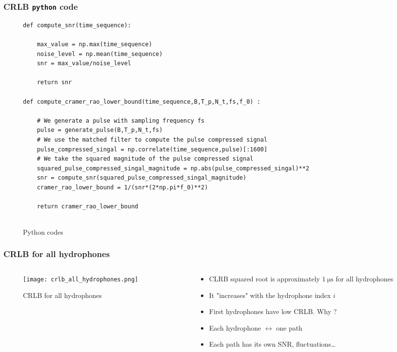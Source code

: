 \documentclass[UKenglish,8pt,aspectratio=1610]{beamer}
\begin{document}
\begin{frame}[fragile]
	\frametitle{CRLB \texttt{python} code}
	\begin{figure}[h!]
	\begin{lstlisting}[language=PythonPlus,style=colorEX]
def compute_snr(time_sequence):
	
	max_value = np.max(time_sequence)
	noise_level = np.mean(time_sequence)
	snr = max_value/noise_level
	
	return snr
	
def compute_cramer_rao_lower_bound(time_sequence,B,T_p,N_t,fs,f_0) :
	
	# We generate a pulse with sampling frequency fs  
	pulse = generate_pulse(B,T_p,N_t,fs)
	# We use the matched filter to compute the pulse compressed signal
	pulse_compressed_singal = np.correlate(time_sequence,pulse)[:1600]
	# We take the squared magnitude of the pulse compressed signal
	squared_pulse_compressed_singal_magnitude = np.abs(pulse_compressed_singal)**2
	snr = compute_snr(squared_pulse_compressed_singal_magnitude)
	cramer_rao_lower_bound = 1/(snr*(2*np.pi*f_0)**2)
	
	return cramer_rao_lower_bound
		
	\end{lstlisting}
	\centering
	\caption{Python codes}
\end{figure}
\end{frame}
\begin{frame}
	\frametitle{CRLB for all hydrophones}
		\begin{columns}
		\begin{column}{0.5\textwidth}
				\vspace{-25pt}
			\begin{figure}[h!]
				\texttt{[image: crlb\_all\_hydrophones.png]}
				\centering
				\caption{CRLB for all hydrophones}
			\end{figure}
			
		\end{column}
		\begin{column}{0.5\textwidth}
		\begin{itemize}
			\item CLRB squared root is approximately $1~\si{\micro\second}$ for all hydrophones
			\item It "increases" with the hydrophone index $i$
			\item First hydrophones have low CRLB. Why ?
			\item Each hydrophone $\longleftrightarrow$ one path
			\item Each path has its own SNR, fluctuations\dots
		\end{itemize}
		\end{column}
	\end{columns} 
\end{frame}
\end{document}
